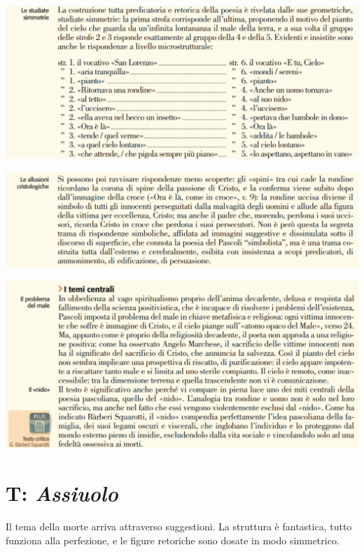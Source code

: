 \documentclass[a4paper, twoside, titlepage]{book}
\begin{document}
\begin{center}
\includegraphics[width=\textwidth]{agosto2}
\end{center}

\begin{center}
\includegraphics[width=\textwidth]{agosto3}
\end{center}

\vfill

\begin{center}
\includegraphics[width=\textwidth]{agosto4}
\end{center}

\section{T: \textit{Assiuolo}}

Il tema della morte arriva attraverso suggestioni.
La struttura è fantastica, tutto funziona alla perfezione, e le figure retoriche sono dosate in modo simmetrico.
\end{document}
